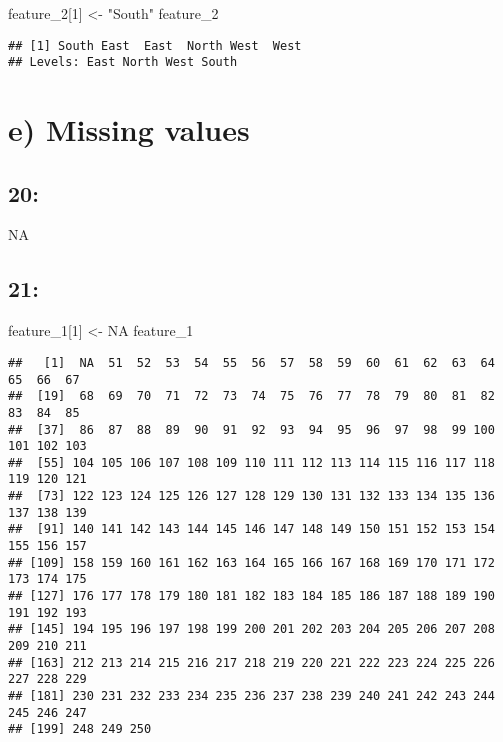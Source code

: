 \documentclass[
]{article}
\newenvironment{Shaded}{\begin{snugshade}}{\end{snugshade}}
\newcommand{\ConstantTok}[1]{\textcolor[rgb]{0.00,0.00,0.00}{#1}}
\newcommand{\DecValTok}[1]{\textcolor[rgb]{0.00,0.00,0.81}{#1}}
\newcommand{\NormalTok}[1]{#1}
\newcommand{\OtherTok}[1]{\textcolor[rgb]{0.56,0.35,0.01}{#1}}
\newcommand{\StringTok}[1]{\textcolor[rgb]{0.31,0.60,0.02}{#1}}
\begin{document}
\begin{Shaded}
\begin{Highlighting}[]
\NormalTok{feature\_2[}\DecValTok{1}\NormalTok{] }\OtherTok{\textless{}{-}} \StringTok{"South"}
\NormalTok{feature\_2}
\end{Highlighting}
\end{Shaded}

\begin{verbatim}
## [1] South East  East  North West  West 
## Levels: East North West South
\end{verbatim}

\hypertarget{e-missing-values}{%
\section{e) Missing values}\label{e-missing-values}}

\hypertarget{section-19}{%
\subsection{20:}\label{section-19}}

NA

\hypertarget{section-20}{%
\subsection{21:}\label{section-20}}

\begin{Shaded}
\begin{Highlighting}[]
\NormalTok{feature\_1[}\DecValTok{1}\NormalTok{] }\OtherTok{\textless{}{-}} \ConstantTok{NA}
\NormalTok{feature\_1}
\end{Highlighting}
\end{Shaded}

\begin{verbatim}
##   [1]  NA  51  52  53  54  55  56  57  58  59  60  61  62  63  64  65  66  67
##  [19]  68  69  70  71  72  73  74  75  76  77  78  79  80  81  82  83  84  85
##  [37]  86  87  88  89  90  91  92  93  94  95  96  97  98  99 100 101 102 103
##  [55] 104 105 106 107 108 109 110 111 112 113 114 115 116 117 118 119 120 121
##  [73] 122 123 124 125 126 127 128 129 130 131 132 133 134 135 136 137 138 139
##  [91] 140 141 142 143 144 145 146 147 148 149 150 151 152 153 154 155 156 157
## [109] 158 159 160 161 162 163 164 165 166 167 168 169 170 171 172 173 174 175
## [127] 176 177 178 179 180 181 182 183 184 185 186 187 188 189 190 191 192 193
## [145] 194 195 196 197 198 199 200 201 202 203 204 205 206 207 208 209 210 211
## [163] 212 213 214 215 216 217 218 219 220 221 222 223 224 225 226 227 228 229
## [181] 230 231 232 233 234 235 236 237 238 239 240 241 242 243 244 245 246 247
## [199] 248 249 250
\end{verbatim}
\end{document}
